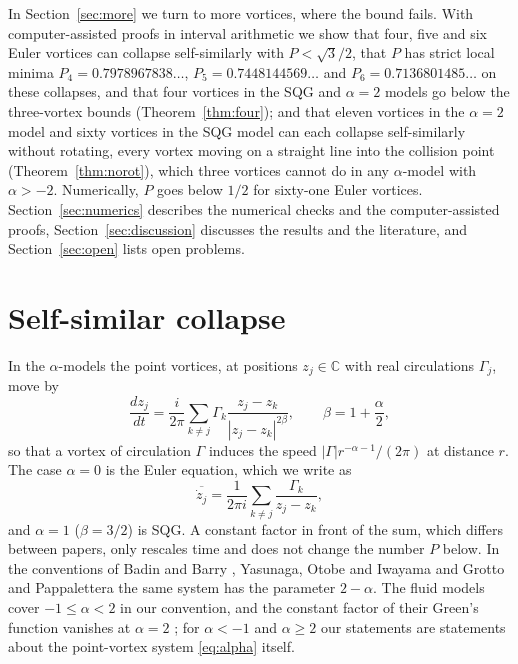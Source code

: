 \documentclass[11pt]{article}
\theoremstyle{definition}
\newcommand{\C}{\mathbb{C}}
\begin{document}
In Section~\ref{sec:more} we turn to more vortices, where the bound fails. With computer-assisted proofs in interval arithmetic we show that four, five and six Euler vortices can collapse self-similarly with $P < \sqrt{3}/2$, that $P$ has strict local minima $P_4 = 0.7978967838\ldots$, $P_5 = 0.7448144569\ldots$ and $P_6 = 0.7136801485\ldots$ on these collapses, and that four vortices in the SQG and $\alpha = 2$ models go below the three-vortex bounds (Theorem~\ref{thm:four}); and that eleven vortices in the $\alpha = 2$ model and sixty vortices in the SQG model can each collapse self-similarly without rotating, every vortex moving on a straight line into the collision point (Theorem~\ref{thm:norot}), which three vortices cannot do in any $\alpha$-model with $\alpha > -2$. Numerically, $P$ goes below $1/2$ for sixty-one Euler vortices. Section~\ref{sec:numerics} describes the numerical checks and the computer-assisted proofs, Section~\ref{sec:discussion} discusses the results and the literature, and Section~\ref{sec:open} lists open problems.

\section{Self-similar collapse}\label{sec:selfsimilar}

In the $\alpha$-models the point vortices, at positions $z_j \in \C$ with real circulations $\Gamma_j$, move by
\begin{equation}\label{eq:alpha}
  \frac{dz_j}{dt} = \frac{i}{2\pi} \sum_{k \ne j} \Gamma_k \frac{z_j - z_k}{|z_j - z_k|^{2\beta}}, \qquad \beta = 1 + \frac{\alpha}{2},
\end{equation}
so that a vortex of circulation $\Gamma$ induces the speed $|\Gamma| r^{-\alpha-1}/(2\pi)$ at distance $r$. The case $\alpha = 0$ is the Euler equation, which we write as
\begin{equation}\label{eq:bs}
  \overline{\dot z_j} = \frac{1}{2\pi i} \sum_{k \ne j} \frac{\Gamma_k}{z_j - z_k},
\end{equation}
and $\alpha = 1$ ($\beta = 3/2$) is SQG. A constant factor in front of the sum, which differs between papers, only rescales time and does not change the number $P$ below. In the conventions of Badin and Barry \cite{bb2018}, Yasunaga, Otobe and Iwayama \cite{yoi2021} and Grotto and Pappalettera \cite{gp2025} the same system has the parameter $2 - \alpha$. The fluid models cover $-1 \le \alpha < 2$ in our convention, and the constant factor of their Green's function vanishes at $\alpha = 2$ \cite[Eq.~(2)]{yoi2021}; for $\alpha < -1$ and $\alpha \ge 2$ our statements are statements about the point-vortex system \eqref{eq:alpha} itself.
\end{document}
